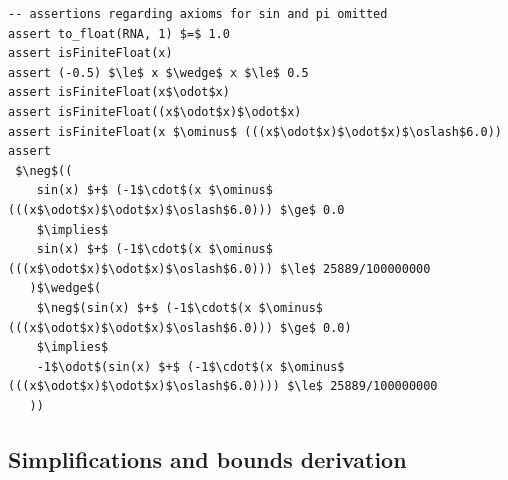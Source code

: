 \documentclass[runningheads]{llncs}
\begin{document}
\begin{lstlisting}[float,caption=NVC corresponding to the post-condition from Listing~\ref{code:sineSpec}, label=vc-sine,basicstyle=\fontsize{7.5}{9pt}\tt]
-- assertions regarding axioms for sin and pi omitted
assert to_float(RNA, 1) $=$ 1.0
assert isFiniteFloat(x) 
assert (-0.5) $\le$ x $\wedge$ x $\le$ 0.5
assert isFiniteFloat(x$\odot$x) 
assert isFiniteFloat((x$\odot$x)$\odot$x) 
assert isFiniteFloat(x $\ominus$ (((x$\odot$x)$\odot$x)$\oslash$6.0)) 
assert
 $\neg$((
    sin(x) $+$ (-1$\cdot$(x $\ominus$ (((x$\odot$x)$\odot$x)$\oslash$6.0))) $\ge$ 0.0 
    $\implies$
    sin(x) $+$ (-1$\cdot$(x $\ominus$ (((x$\odot$x)$\odot$x)$\oslash$6.0))) $\le$ 25889/100000000
   )$\wedge$(
    $\neg$(sin(x) $+$ (-1$\cdot$(x $\ominus$ (((x$\odot$x)$\odot$x)$\oslash$6.0))) $\ge$ 0.0)
    $\implies$
    -1$\odot$(sin(x) $+$ (-1$\cdot$(x $\ominus$ (((x$\odot$x)$\odot$x)$\oslash$6.0)))) $\le$ 25889/100000000
   ))
\end{lstlisting}


\subsection{Simplifications and bounds derivation}\label{sec:simple-preprocessing}
\end{document}
